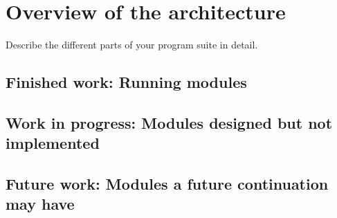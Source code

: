 \chapter{Overview of the architecture}
Describe the different parts of your program suite in detail.
\section{Finished work: Running modules}
\section{Work in progress: Modules designed but not implemented}
\section{Future work: Modules a future continuation may have}


